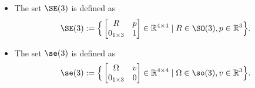\begin{itemize}
\item The set $\SE(3)$ is defined as
\begin{align}
\SE(3) :=  
\Big\{ 
\begin{bmatrix} R & p \\ 0_{1\times3} & 1 \end{bmatrix} \in \mathbb{R}^{4 \times 4} \mid 
R \in \SO(3), p \in \mathbb{R}^3
\Big\} .
\end{align}
\item The set $\se(3)$ is defined as
\begin{align}
\se(3) :=  
\Big\{ 
\begin{bmatrix} \Omega & v \\ 0_{1\times3} & 0 \end{bmatrix} \in \mathbb{R}^{4 \times 4}  \mid \Omega \in \so(3), v \in \mathbb{R}^3 
\Big\}.
\end{align}



\end{itemize}
